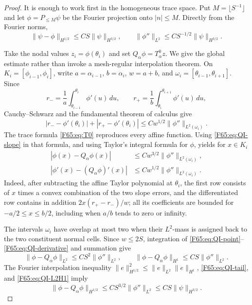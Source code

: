 \documentclass[11pt]{amsart}
\numberwithin{equation}{section}
\theoremstyle{definition}
\theoremstyle{remark}
\begin{document}
\begin{proof}
It is enough to work first in the homogeneous trace space.  Put
\(M=\lfloor S^{-1}\rfloor\) and let \(\phi=P_{\le M}\psi\) be the
Fourier projection onto \(|n|\le M\).  Directly from the Fourier norms,
\begin{equation}\label{F65:eq:QI-tail}
 \|\psi-\phi\|_{H^{1/2}}
 \le CS\|\psi\|_{H^{3/2}},
 \qquad
 \|\phi''\|_{L^2}
 \le CS^{-1/2}\|\psi\|_{H^{3/2}}.
\end{equation}

Take the nodal values \(z_i=\phi(\theta_i)\) and set
\(Q_\alpha\phi=T_\alpha^0z\).  We give the global estimate rather than
invoke a mesh-regular interpolation theorem.  On
\(K_i=[\phi_{i-1},\phi_i]\), write
\(a=\alpha_{i-1}\), \(b=\alpha_i\), \(w=a+b\), and
\(\omega_i=[\theta_{i-1},\theta_{i+1}]\).  Since
\begin{equation*}
 r_-=\frac1a\int_{\theta_{i-1}}^{\theta_i}\phi'(u)\,du,
 \qquad
 r_+=\frac1b\int_{\theta_i}^{\theta_{i+1}}\phi'(u)\,du,
\end{equation*}
Cauchy--Schwarz and the fundamental theorem of calculus give
\begin{equation}\label{F65:eq:QI-slope}
 |r_--\phi'(\theta_i)|+|r_+-\phi'(\theta_i)|
 \le Cw^{1/2}\|\phi''\|_{L^2(\omega_i)}.
\end{equation}
The trace formula \eqref{F65:eq:T0} reproduces every affine function.  Using
\eqref{F65:eq:QI-slope} in that formula, and using Taylor's integral formula
for \(\phi\), yields for \(x\in K_i\)
\begin{align}
 |\phi(x)-Q_\alpha\phi(x)|
 &\le Cw^{3/2}\|\phi''\|_{L^2(\omega_i)},\label{F65:eq:QI-point}\\
 |\phi'(x)-(Q_\alpha\phi)'(x)|
 &\le Cw^{1/2}\|\phi''\|_{L^2(\omega_i)}.\label{F65:eq:QI-derivative}
\end{align}
Indeed, after subtracting the affine Taylor polynomial at \(\theta_i\),
the first row consists of \(x\) times a convex combination of the two
slope errors, and the differentiated row contains in addition
\(2x(r_+-r_-)/w\); all its coefficients are bounded for
\(-a/2\le x\le b/2\), including when \(a/b\) tends to zero or infinity.

The intervals \(\omega_i\) have overlap at most two when their
\(L^2\)-mass is assigned back to the two constituent normal cells.
Since \(w\le2S\), integration of
\eqref{F65:eq:QI-point}--\eqref{F65:eq:QI-derivative} and summation give
\begin{equation}\label{F65:eq:QI-L2H1}
 \|\phi-Q_\alpha\phi\|_{L^2}
 \le CS^2\|\phi''\|_{L^2},
 \qquad
 \|\phi-Q_\alpha\phi\|_{H^1}
 \le CS\|\phi''\|_{L^2}.
\end{equation}
The Fourier interpolation inequality
\(\|e\|_{H^{1/2}}^2\le\|e\|_{L^2}\|e\|_{H^1}\),
\eqref{F65:eq:QI-tail}, and \eqref{F65:eq:QI-L2H1} imply
\begin{equation}\label{F65:eq:QI-homogeneous}
 \|\phi-Q_\alpha\phi\|_{H^{1/2}}
 \le CS^{3/2}\|\phi''\|_{L^2}
 \le CS\|\psi\|_{H^{3/2}}.
\end{equation}


\end{proof}
\end{document}
